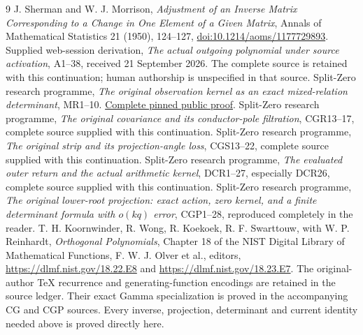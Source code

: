 \documentclass[11pt]{article}
\begin{document}
\begin{thebibliography}{9}
 J. Sherman and W. J. Morrison,
\emph{Adjustment of an Inverse Matrix Corresponding to a Change
in One Element of a Given Matrix}, Annals of Mathematical Statistics
21 (1950), 124--127,
\href{https://doi.org/10.1214/aoms/1177729893}{doi:10.1214/aoms/1177729893}.
 Supplied web-session derivation,
\emph{The actual outgoing polynomial under source activation},
A1--38, received 21 September 2026. The complete source is retained
with this continuation; human authorship is unspecified in that source.
 Split-Zero research programme,
\emph{The original observation kernel as an exact mixed-relation
determinant}, MR1--10.
\href{https://github.com/KokunoYumeto/zeta-function-research-reader/blob/5992ad50c0f2a06921f1fcaded7b4e38097c0739/workbenches/splitzero-tandem/continuations/20260920-original-kernel-mixed-determinants/ORIGINAL_KERNEL_MIXED_DETERMINANT.tex#L36}{Complete pinned public proof}.
 Split-Zero research programme,
\emph{The original covariance and its conductor-pole filtration},
CGR13--17, complete source supplied with this continuation.
 Split-Zero research programme,
\emph{The original strip and its projection-angle loss},
CGS13--22, complete source supplied with this continuation.
 Split-Zero research programme,
\emph{The evaluated outer return and the actual arithmetic kernel},
DCR1--27, especially DCR26, complete source supplied with this continuation.
 Split-Zero research programme,
\emph{The original lower-root projection: exact action, zero kernel,
and a finite determinant formula with \(o(kq)\) error},
CGP1--28, reproduced completely in the reader.
 T. H. Koornwinder, R. Wong, R. Koekoek,
R. F. Swarttouw, with W. P. Reinhardt,
\emph{Orthogonal Polynomials}, Chapter 18 of the
NIST Digital Library of Mathematical Functions,
F. W. J. Olver et al., editors,
\url{https://dlmf.nist.gov/18.22.E8} and
\url{https://dlmf.nist.gov/18.23.E7}.
The original-author TeX recurrence and generating-function encodings
are retained in the source ledger. Their exact Gamma specialization is
proved in the accompanying CG and CGP sources. Every inverse, projection,
determinant and current identity needed above is proved directly here.
\end{thebibliography}
\end{document}
